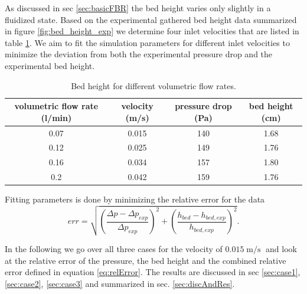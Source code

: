 As discussed in sec \ref{sec:basicFBR} the bed height varies only slightly in a fluidized state.
Based on the experimental gathered bed height data summarized in figure \ref{fig:bed_height_exp} we determine four inlet velocities that are listed in table \ref{tab:expData}.
We aim to fit the simulation parameters for different inlet velocities to minimize the deviation from both the experimental pressure drop and the experimental bed height.
\begin{table}[h!]
    \centering
    \begin{tabular}{c|c c c}
         volumetric flow rate (l/min) & velocity (m/s) & pressure drop (Pa) & bed height (cm) \\
         \hline
         0.07 & 0.015 & 140 & 1.68\\
         0.12 & 0.025 & 149 & 1.76\\
         0.16 & 0.034 & 157 & 1.80\\
         0.2 & 0.042 & 159 & 1.76 
    \end{tabular}
    \caption{Bed height for different volumetric flow rates.}
    \label{tab:expData}
\end{table}

Fitting parameters is done by minimizing the relative error for the data 
 \begin{equation}
 \label{eq:relError}
        err = \sqrt{\left( \dfrac{\Delta p - \Delta p_{exp}}{\Delta p_{exp}}\right)^2 + \left( \dfrac{h_{bed} - h_{bed,exp}}{h_{bed,exp}} \right)^2}.
\end{equation}


In the following we go over all three cases for the velocity of $0.015 \operatorname{m/s}$ and look at the relative error of the pressure, the bed height and the combined relative error defined in equation \eqref{eq:relError}.
The results are discussed in sec \ref{sec:case1}, \ref{sec:case2}, \ref{sec:case3}
and summarized in sec. \ref{sec:discAndRes}.




